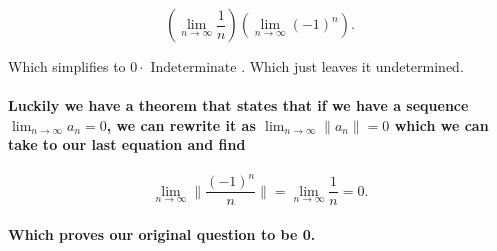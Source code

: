 \[
	\left( \lim_{n \to \infty} \frac{1}{n} \right) \left( \lim_{n \to \infty} \left( -1 \right) ^{n} \right) 
.\] 

Which simplifies to $0 \cdot \text{ Indeterminate }$. Which just leaves it undetermined. 

\paragraph{Luckily we have a theorem that states that if we have a sequence $\lim_{n \to \infty} a_n = 0$, we can rewrite it as $\lim_{n \to \infty} \|a_n\| = 0$ which we can take to our last equation and find}

\[
\lim_{n \to \infty} \|\frac{\left( -1 \right) ^{n}}{n}\|=\lim_{n \to \infty} \frac{1}{n}=0
.\] 
\paragraph{Which proves our original question to be 0.}

